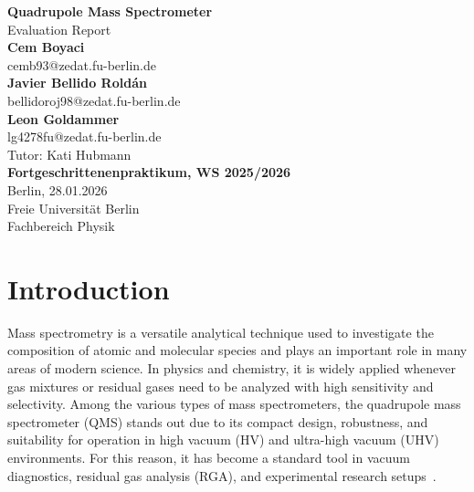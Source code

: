\documentclass[a4paper]{article}
\begin{document}
\begin{titlepage}
  \thispagestyle{empty}
  \begin{center}

    \vspace*{1cm}
    {\LARGE \textbf{Quadrupole Mass Spectrometer}}\\[1.2cm]

    {\large Evaluation Report}\\[2cm]

    \large
    \textbf{Cem Boyaci}\\[-1mm]
    {cemb93@zedat.fu-berlin.de}\\[1cm]

    \textbf{Javier Bellido Roldán}\\[-1mm]
    {bellidoroj98@zedat.fu-berlin.de}\\[1cm]

    \textbf{Leon Goldammer}\\[-1mm]
    {lg4278fu@zedat.fu-berlin.de}\\[6cm]

    \normalsize
    {Tutor: Kati Hubmann}\\[1.2cm]

    \textbf{Fortgeschrittenenpraktikum, WS 2025/2026}\\
    Berlin, 28.01.2026\\
    Freie Universität Berlin\\
    Fachbereich Physik

  \end{center}
\end{titlepage}

\clearpage
\renewcommand*\contentsname{\huge Contents}
{
  \tableofcontents
  \clearpage
}

\newpage
\setcounter{page}{1}

\section{Introduction}

Mass spectrometry is a versatile analytical technique used to investigate the composition of atomic and molecular species and plays an important role in many areas of modern science.
In physics and chemistry, it is widely applied whenever gas mixtures or residual gases need to be analyzed with high sensitivity and selectivity.
Among the various types of mass spectrometers, the quadrupole mass spectrometer (QMS) stands out due to its compact design, robustness, and suitability for operation in high vacuum (HV) and ultra-high vacuum (UHV) environments.
For this reason, it has become a standard tool in vacuum diagnostics, residual gas analysis (RGA), and experimental research setups~\cite{jousten_ellefson_partialdruckmessung_2017}.
\end{document}
